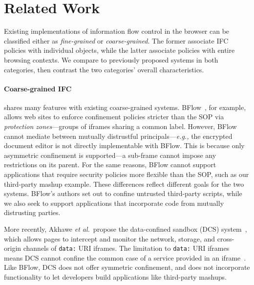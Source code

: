 \section{Related Work}
\label{sec:related}

Existing implementations of information flow control in the browser
can be classified either as \emph{fine-grained} or
\emph{coarse-grained}. The former associate IFC policies with
individual objects, while the latter associate policies with entire
browsing contexts. We compare \sys{} to previously proposed systems
in both categories, then contrast the two categories' overall
characteristics.

\paragraph{Coarse-grained IFC} \sys{} shares many features
with existing coarse-grained systems.
%
BFlow~\cite{Yip:2009:PBS}, for example, allows web sites to enforce confinement policies
stricter than the SOP via \emph{protection zones}---groups of iframes sharing a common label.
%
%
However, BFlow cannot mediate between mutually
distrustful principals---\emph{e.g.,} the
encrypted document editor is not directly implementable with BFlow.
%
This is because only asymmetric confinement is supported---a
sub-frame cannot impose any restrictions on its parent.
%
For the same reasons, BFlow cannot support applications that require
security policies more flexible than the SOP, such as our third-party
mashup example.
%
These differences reflect different goals for the two systems. BFlow's
authors set out to confine untrusted third-party scripts, while we
also seek to support applications that incorporate code from mutually
distrusting parties.


More recently, Akhawe \emph{et al.}~propose the data-confined sandbox
(DCS) system~\cite{Akhawe2013}, which allows pages to intercept and
monitor the network, storage, and cross-origin channels of \verb|data:| URI iframes.
%
The limitation to
\verb|data:| URI iframes means DCS cannot confine the
common case of a service provided in an iframe~\cite{postman}.
%
Like BFlow, DCS does not offer symmetric confinement, and does
not incorporate functionality to let developers build
applications like third-party mashups.
%

